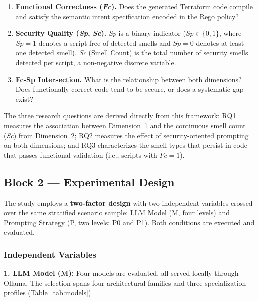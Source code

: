 \begin{enumerate}[label=\textbf{Dim \arabic*:}, leftmargin=*]
    \item \textbf{Functional Correctness (\textit{Fc}).} Does the
          generated Terraform code compile and satisfy the semantic
          intent specification encoded in the Rego policy?
    \item \textbf{Security Quality (\textit{Sp}, \textit{Sc}).}
          \textit{Sp} is a binary indicator ($Sp \in \{0,1\}$, where
          $Sp = 1$ denotes a script free of detected smells and $Sp = 0$
          denotes at least one detected smell). \textit{Sc} (Smell Count)
          is the total number of security smells detected per script,
          a non-negative discrete variable.
    \item \textbf{Fc-Sp Intersection.} What is the relationship
          between both dimensions? Does functionally correct code
          tend to be secure, or does a systematic gap exist?
\end{enumerate}

The three research questions are derived directly from this
framework: RQ1 measures the association between Dimension~1 and the
continuous smell count (\textit{Sc}) from Dimension~2; RQ2 measures
the effect of security-oriented prompting on both dimensions; and
RQ3 characterizes the smell types that persist in code that passes
functional validation (i.e., scripts with $Fc = 1$).

\subsection{Block 2 --- Experimental Design}
\label{sec:block2}

The study employs a \textbf{two-factor design} with two independent
variables crossed over the same stratified scenario sample: LLM Model
(M, four levels) and Prompting Strategy (P, two levels: P0 and P1).
Both conditions are executed and evaluated.

\subsubsection{Independent Variables}

\textbf{1. LLM Model (M):} Four models are evaluated, all served
locally through Ollama. The selection spans four architectural
families and three specialization profiles (Table~\ref{tab:models}).

